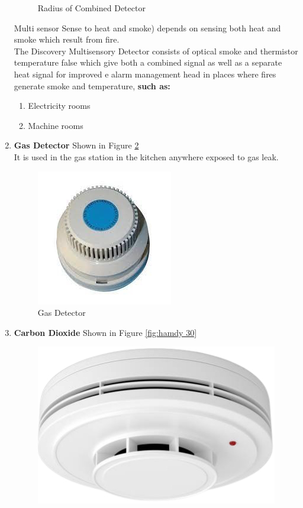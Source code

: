 \documentclass[12pt,fleqn]{book} %
\begin{document}
\begin{enumerate}
\begin{figure}[!h]
    \caption{Radius of Combined Detector}
    \label{fig:hamdy 28}
\end{figure} 
Multi sensor Sense to heat and smoke) depends on sensing both heat and smoke which result from fire.\\
The Discovery Multisensory Detector consists of optical smoke and thermistor temperature false which give both a combined signal as well as a separate heat signal for improved e alarm management head in places where fires generate smoke and temperature, \textbf{such as:}

\begin{enumerate}
    \item Electricity rooms
    \item Machine rooms
\end{enumerate}
\item \textbf{Gas Detector} Shown in Figure \ref{fig:hamdy 29} \\
It is used in the gas station in the kitchen anywhere exposed to gas leak.
\begin{figure}[!h]
    \centering
    \includegraphics[width=0.5\linewidth]{hamdy 29.png}
    \caption{Gas Detector}
    \label{fig:hamdy 29}
\end{figure}
\item \textbf{Carbon Dioxide} Shown in Figure \ref{fig:hamdy 30}
\begin{figure}[!h]
    \centering
    \includegraphics[width=0.5\linewidth]{hamdy 30.png}

\end{figure}
\end{enumerate}
\end{document}
